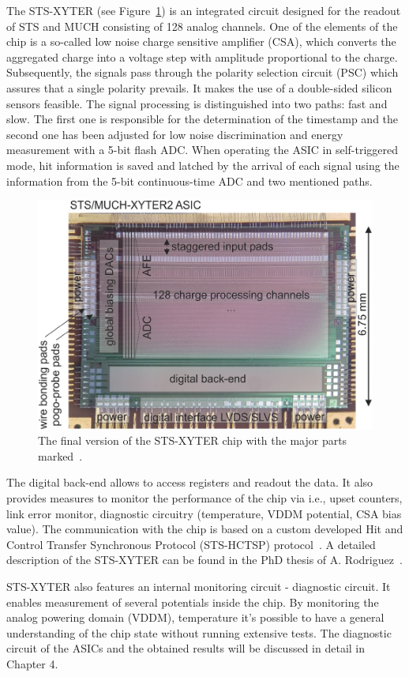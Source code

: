The STS-XYTER (see Figure~\ref{sts_xyter}) is an integrated circuit designed for the readout of \gls{STS} and \gls{MUCH} consisting of 128 analog channels. One of the elements of the chip is a so-called low noise charge sensitive amplifier (\gls{CSA}), which converts the aggregated charge into a voltage step with amplitude proportional to the charge. Subsequently, the signals pass through the polarity selection circuit (\gls{PSC}) which assures that a single polarity prevails. It makes the use of a double-sided silicon sensors feasible. The signal processing is distinguished into two paths: fast and slow. The first one is responsible for the determination of the timestamp and the second one has been adjusted for low noise discrimination and energy measurement with a 5-bit flash ADC. When operating the \gls{ASIC} in self-triggered mode, hit information is saved and latched by the arrival of each signal using the information from the 5-bit continuous-time ADC and two mentioned paths. 

\begin{figure}[!h]
\centering
\includegraphics[width=0.65\columnwidth]{Chapter2/images/ASIC2.2.png}
\caption{The final version of the STS-XYTER chip with the major parts marked~\cite{KASINSKI2018225}.}
\label{sts_xyter}
\end{figure}

The digital back-end allows to access registers and readout the data. It also provides measures to monitor the performance of the chip via i.e., upset counters, link error monitor, diagnostic circuitry (temperature, VDDM potential, CSA bias value). The communication with the chip is based on a custom developed Hit and Control Transfer Synchronous Protocol (STS-HCTSP) protocol~\cite{Kasinski_2016}. A detailed description of the STS-XYTER can be found in the PhD thesis of A. Rodriguez~\cite{RodriguezRodriguez2020}.

STS-XYTER also features an internal monitoring circuit - diagnostic circuit. It enables measurement of several potentials inside the chip. By monitoring the analog powering domain (VDDM), temperature it's possible to have a general understanding of the chip state without running extensive tests. The diagnostic circuit of the \glspl{ASIC} and the obtained results will be discussed in detail in Chapter 4.
